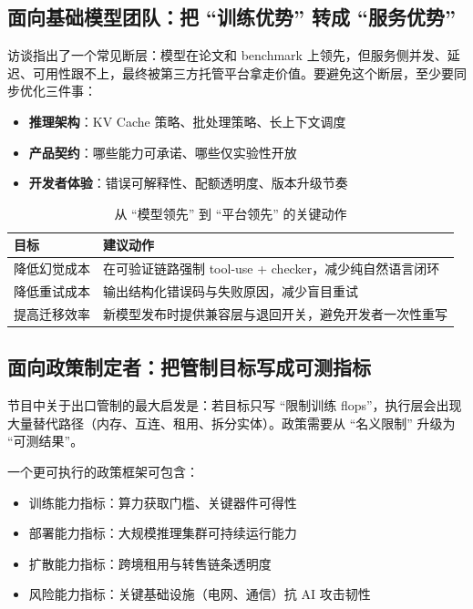 \documentclass[a4paper]{article}
\begin{document}
\subsection{面向基础模型团队：把 ``训练优势'' 转成 ``服务优势''}

访谈指出了一个常见断层：模型在论文和 benchmark 上领先，但服务侧并发、延迟、可用性跟不上，最终被第三方托管平台拿走价值。要避免这个断层，至少要同步优化三件事：
\begin{itemize}
    \item \textbf{推理架构}：KV Cache 策略、批处理策略、长上下文调度
    \item \textbf{产品契约}：哪些能力可承诺、哪些仅实验性开放
    \item \textbf{开发者体验}：错误可解释性、配额透明度、版本升级节奏
\end{itemize}

\begin{table}[H]
\centering
\begin{tabular}{lp{8.5cm}}
\toprule
\textbf{目标} & \textbf{建议动作} \\
\midrule
降低幻觉成本 & 在可验证链路强制 tool-use + checker，减少纯自然语言闭环 \\
降低重试成本 & 输出结构化错误码与失败原因，减少盲目重试 \\
提高迁移效率 & 新模型发布时提供兼容层与退回开关，避免开发者一次性重写 \\
\bottomrule
\end{tabular}
\caption{从 ``模型领先'' 到 ``平台领先'' 的关键动作}
\end{table}

\subsection{面向政策制定者：把管制目标写成可测指标}

节目中关于出口管制的最大启发是：若目标只写 ``限制训练 flops''，执行层会出现大量替代路径（内存、互连、租用、拆分实体）。政策需要从 ``名义限制'' 升级为 ``可测结果''。

一个更可执行的政策框架可包含：
\begin{itemize}
    \item 训练能力指标：算力获取门槛、关键器件可得性
    \item 部署能力指标：大规模推理集群可持续运行能力
    \item 扩散能力指标：跨境租用与转售链条透明度
    \item 风险能力指标：关键基础设施（电网、通信）抗 AI 攻击韧性
\end{itemize}
\end{document}
